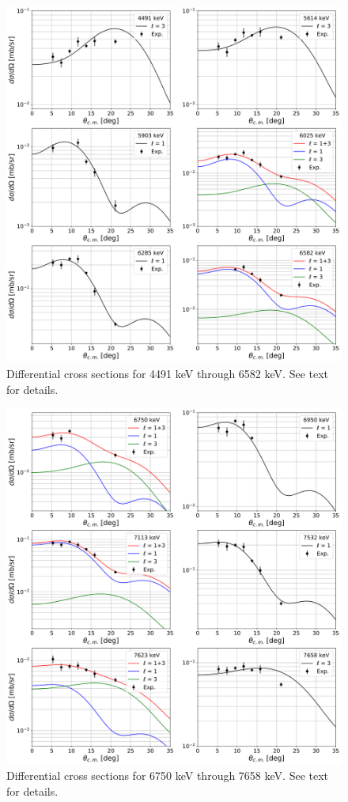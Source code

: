 \begin{figure}[H]
\centering
\includegraphics[width=6.5in]{Chapter-6/figs/diffcross_6panel_1.png}
\caption{\label{fig:diffcross_6panel_1}Differential cross sections for 4491 keV through 6582 keV. See text for details.}
\end{figure}

\newpage

\begin{figure}[H]
\centering
\includegraphics[width=6.5in]{Chapter-6/figs/diffcross_6panel_2.png}
\caption{\label{fig:diffcross_6panel_2}Differential cross sections for 6750 keV through 7658 keV. See text for details.}
\end{figure}

